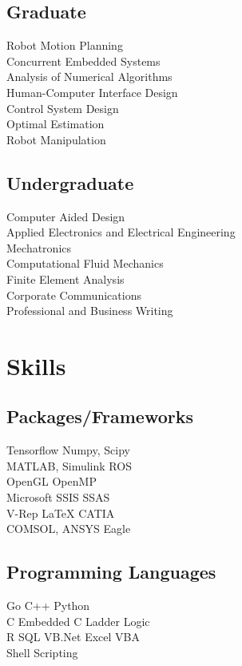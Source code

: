 \documentclass[]{deedy-resume-openfont}
\begin{document}
\begin{minipage}[t]{0.33\textwidth}
\subsection{Graduate}
Robot Motion Planning\\
Concurrent Embedded Systems\\
Analysis of Numerical Algorithms\\
Human-Computer Interface Design\\
Control System Design\\
Optimal Estimation\\
Robot Manipulation\\

\sectionsep{}

\subsection{Undergraduate}
Computer Aided Design \\
Applied Electronics and Electrical Engineering\\
Mechatronics \\
Computational Fluid Mechanics\\
Finite Element Analysis\\
Corporate Communications\\
Professional and Business Writing\\
\sectionsep


\section{Skills}
\subsection{Packages/Frameworks}

Tensorflow \textbullet{}Numpy, Scipy  \\ 
MATLAB, Simulink \textbullet{}
ROS \\ 
OpenGL \textbullet{} OpenMP \\
Microsoft SSIS \textbullet{} SSAS \\
V-Rep \textbullet{} \LaTeX \textbullet{}
CATIA\\ COMSOL, ANSYS \textbullet{} Eagle

\sectionsep
\subsection{Programming Languages}
Go \textbullet{} C++ \textbullet{} Python \\C \textbullet{}
Embedded C \textbullet{}Ladder Logic\\
R \textbullet{} SQL \textbullet{} VB.Net \textbullet{} Excel VBA\\
Shell Scripting

%
%

\end{minipage} 
\end{document}
